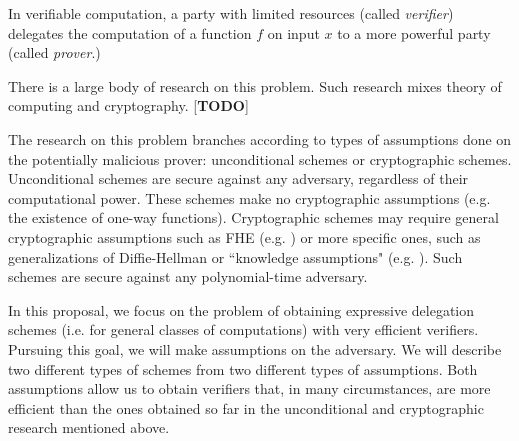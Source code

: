 \begin{comment}
In this section I describe the motivation of the problem and of the design choices.

Problem: Efficient Delegation of Computation 
[The motivation for this is straightforward]

Design Principles and Points of Focus:
- (almost) "lack" of cryptography (in the FG case, for reasons of both efficiency and assumptions)
- adversarial assumptions:
-- rationality, or
-- limited resources (circuit depth)


\end{comment}



In verifiable computation, a party with limited resources (called \textit{verifier}) delegates the computation of a function $f$ on input $x$ to a more powerful party (called \textit{prover}.)

There is a large body of research on this problem. Such research mixes theory of computing and cryptography.
[\textbf{TODO}]

The research on this problem branches according to types of assumptions done on the potentially malicious prover:
unconditional schemes or cryptographic schemes. Unconditional schemes are secure against any adversary, regardless of their computational power. These schemes make no cryptographic assumptions (e.g. the existence of one-way functions). Cryptographic schemes may require general cryptographic assumptions such as FHE (e.g. \cite{ggp09} ) or more specific ones, such as generalizations of Diffie-Hellman or ``knowledge assumptions" \CN (e.g. \cite{qsp}). Such schemes are secure against any polynomial-time adversary.

In this proposal, we focus on the problem of obtaining expressive delegation schemes (i.e. for general classes of computations) 
with very efficient verifiers.  Pursuing this goal, we will make assumptions on the adversary.
We will describe two different types of schemes from two different types of assumptions. Both assumptions allow us to obtain verifiers that, in many circumstances, are more efficient than the ones obtained so far in the  \XXX unconditional and cryptographic research mentioned above.

